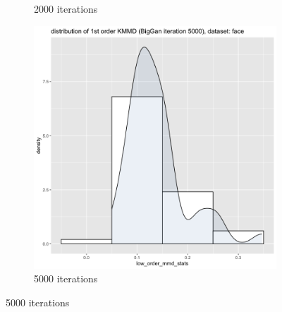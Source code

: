 \documentclass{article}
\begin{document}
\begin{figure}[h!]
\begin{subfigure}[b]{0.3\textwidth}
         \caption{2000 iterations}
     \end{subfigure}
     \hfill
     \begin{subfigure}[b]{0.3\textwidth}
         \centering
         \includegraphics[width=\textwidth]{kmmd_figures/biggan_face_lowdist_5000.png}
         \caption{5000 iterations}
     \end{subfigure}
\end{figure}
\end{document}
